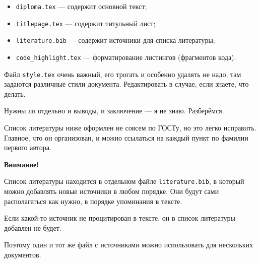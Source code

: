 \documentclass[14pt,oneside]{extarticle}
\begin{document}
\begin{itemize}
    \item \verb|diploma.tex| --- содержит основной текст;
    \item \verb|titlepage.tex| --- содержит титульный лист;
    \item \verb|literature.bib| --- содержит источники для списка литературы;
    \item \verb|code_highlight.tex| --- форматирование листингов (фрагментов кода).
\end{itemize}

Файл \verb|style.tex| очень важный, его трогать и особенно удалять не надо, там задаются различные стили документа. Редактировать в случае, если знаете, что делать.


Нужны ли отдельно и выводы, и заключение --- я не знаю. Разберёмся.

Список литературы ниже оформлен не совсем по ГОСТу, но это легко исправить. Главное, что он организован, и можно ссылаться на каждый пункт по фамилии первого автора.

\textbf{Внимание!} 

Список литературы находится в отдельном файле \verb|literature.bib|, в который можно добавлять новые источники в любом порядке. Они будут сами располагаться как нужно, в порядке упоминания в тексте.

Если какой-то источник не процитирован в тексте, он в список литературы добавлен не будет.

Поэтому один и тот же файл с источниками можно использовать для нескольких документов.


\pagebreak
\printbibliography
\end{document}
